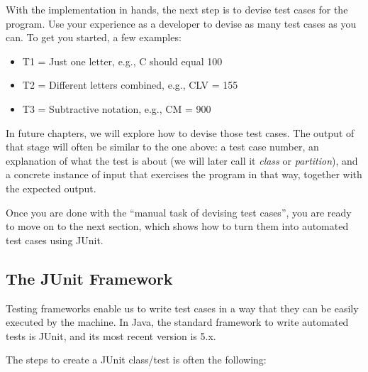 With the implementation in hands, the next step is to devise test cases
for the program. Use your experience as a developer to devise as many
test cases as you can. To get you started, a few examples:

\begin{itemize}
\tightlist
\item
  T1 = Just one letter, e.g., C should equal 100
\item
  T2 = Different letters combined, e.g., CLV = 155
\item
  T3 = Subtractive notation, e.g., CM = 900
\end{itemize}

In future chapters, we will explore how to devise those test cases. The
output of that stage will often be similar to the one above: a test case
number, an explanation of what the test is about (we will later call it
\emph{class} or \emph{partition}), and a concrete instance of input that
exercises the program in that way, together with the expected output.

Once you are done with the ``manual task of devising test cases'', you
are ready to move on to the next section, which shows how to turn them
into automated test cases using JUnit.

\hypertarget{the-junit-framework}{%
\subsection{The JUnit Framework}\label{the-junit-framework}}

Testing frameworks enable us to write test cases in a way that they can
be easily executed by the machine. In Java, the standard framework to
write automated tests is JUnit, and its most recent version is 5.x.

The steps to create a JUnit class/test is often the following:

